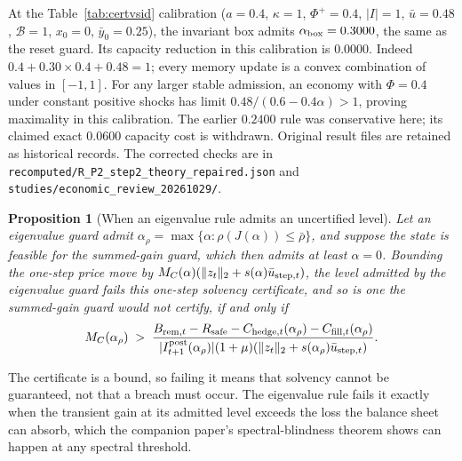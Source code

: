 \documentclass[12pt]{article}
\newtheorem{proposition}[theorem]{Proposition}
\theoremstyle{definition}
\theoremstyle{remark}
\begin{document}
At the Table~\ref{tab:certvsid} calibration ($a=0.4$, $\kappa=1$, $\Phi^+=0.4$, $|I|=1$, $\bar u=0.48$, $\mathcal B=1$, $x_0=0$, $\bar y_0=0.25$), the invariant box admits $\alpha_{\rm box}=0.3000$, the same as the reset guard. Its capacity reduction in this calibration is $0.0000$. Indeed $0.4+0.30\times0.4+0.48=1$; every memory update is a convex combination of values in $[-1,1]$. For any larger stable admission, an economy with $\Phi=0.4$ under constant positive shocks has limit $0.48/(0.6-0.4\alpha)>1$, proving maximality in this calibration. The earlier $0.2400$ rule was conservative here; its claimed exact $0.0600$ capacity cost is withdrawn. Original result files are retained as historical records. The corrected checks are in \texttt{recomputed/R\_P2\_step2\_theory\_repaired.json} and \texttt{studies/economic\_review\_20261029/}.

\begin{proposition}[When an eigenvalue rule admits an uncertified level]\label{prop:dominance}
Let an eigenvalue guard admit $\alpha_\rho=\max\{\alpha:\rho(J(\alpha))\le\bar\rho\}$, and suppose the state is feasible for the summed-gain guard, which then admits at least $\alpha=0$. Bounding the one-step price move by $M_C(\alpha)(\|z_t\|_2+s(\alpha)\bar u_{{\rm step},t})$, the level admitted by the eigenvalue guard fails this one-step solvency certificate, and so is one the summed-gain guard would not certify, if and only if
\[
M_C(\alpha_\rho)\;>\;\frac{B_{{\rm rem},t}-R_{\rm safe}-C_{{\rm hedge},t}(\alpha_\rho)-C_{{\rm fill},t}(\alpha_\rho)}{|I^{\rm post}_{t+1}(\alpha_\rho)|(1+\mu)(\|z_t\|_2+s(\alpha_\rho)\bar u_{{\rm step},t})} .
\]
\end{proposition}

The certificate is a bound, so failing it means that solvency cannot be guaranteed, not that a breach must occur. The eigenvalue rule fails it exactly when the transient gain at its admitted level exceeds the loss the balance sheet can absorb, which the companion paper's spectral-blindness theorem shows can happen at any spectral threshold.
\end{document}
